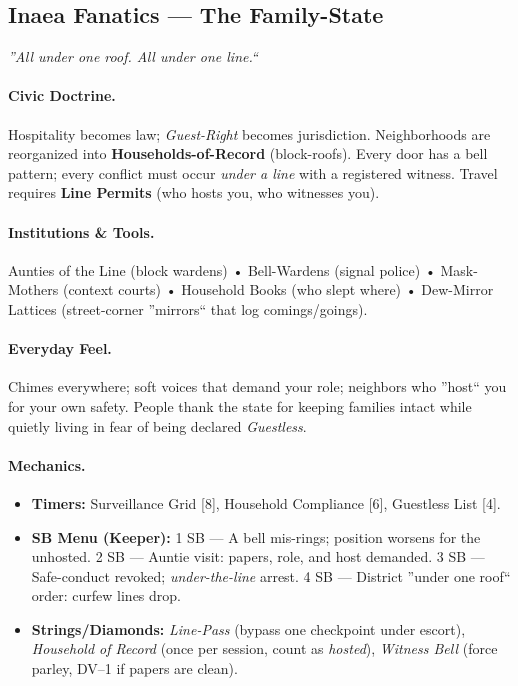 \documentclass[11pt]{article}
\begin{document}
\subsection*{Inaea Fanatics --- The Family-State}
\textit{''All under one roof. All under one line.``}
\paragraph{Civic Doctrine.}
Hospitality becomes law; \emph{Guest-Right} becomes jurisdiction. Neighborhoods are reorganized into \textbf{Households-of-Record} (block-roofs). Every door has a bell pattern; every conflict must occur \emph{under a line} with a registered witness. Travel requires \textbf{Line Permits} (who hosts you, who witnesses you).

\paragraph{Institutions \& Tools.}
Aunties of the Line (block wardens) • Bell-Wardens (signal police) • Mask-Mothers (context courts) • Household Books (who slept where) • Dew-Mirror Lattices (street-corner ''mirrors`` that log comings/goings).

\paragraph{Everyday Feel.}
Chimes everywhere; soft voices that demand your role; neighbors who ''host`` you for your own safety. People thank the state for keeping families intact while quietly living in fear of being declared \emph{Guestless}.

\paragraph{Mechanics.}
\begin{itemize}
  \item \textbf{Timers:} Surveillance Grid [8], Household Compliance [6], Guestless List [4].
  \item \textbf{SB Menu (Keeper):} 
    1 SB --- A bell mis-rings; position worsens for the unhosted. 
    2 SB --- Auntie visit: papers, role, and host demanded. 
    3 SB --- Safe-conduct revoked; \emph{under-the-line} arrest. 
    4 SB --- District ''under one roof`` order: curfew lines drop.
  \item \textbf{Strings/Diamonds:} 
    \emph{Line-Pass} (bypass one checkpoint under escort), 
    \emph{Household of Record} (once per session, count as \emph{hosted}), 
    \emph{Witness Bell} (force parley, DV--1 if papers are clean).
\end{itemize}
\end{document}

